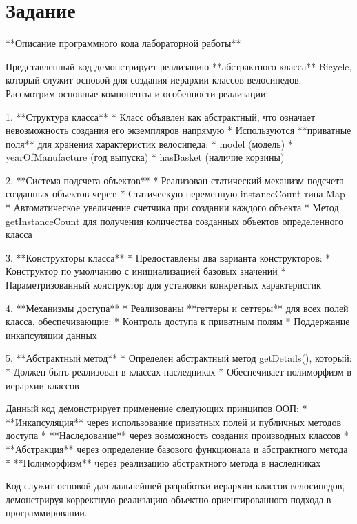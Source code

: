 \chapter{Задание}
\label{ch:Task1}

\begin{markdown}

**Описание программного кода лабораторной работы**

Представленный код демонстрирует реализацию **абстрактного класса** Bicycle, который служит основой для создания иерархии классов велосипедов. Рассмотрим основные компоненты и особенности реализации:

1. **Структура класса**
* Класс объявлен как абстрактный, что означает невозможность создания его экземпляров напрямую
* Используются **приватные поля** для хранения характеристик велосипеда:
  * model (модель)
  * yearOfManufacture (год выпуска)
  * hasBasket (наличие корзины)

2. **Система подсчета объектов**
* Реализован статический механизм подсчета созданных объектов через:
  * Статическую переменную instanceCount типа Map
  * Автоматическое увеличение счетчика при создании каждого объекта
  * Метод getInstanceCount для получения количества созданных объектов определенного класса

3. **Конструкторы класса**
* Предоставлены два варианта конструкторов:
  * Конструктор по умолчанию с инициализацией базовых значений
  * Параметризованный конструктор для установки конкретных характеристик

4. **Механизмы доступа**
* Реализованы **геттеры и сеттеры** для всех полей класса, обеспечивающие:
  * Контроль доступа к приватным полям
  * Поддержание инкапсуляции данных

5. **Абстрактный метод**
* Определен абстрактный метод getDetails(), который:
  * Должен быть реализован в классах-наследниках
  * Обеспечивает полиморфизм в иерархии классов

Данный код демонстрирует применение следующих принципов ООП:
* **Инкапсуляция** через использование приватных полей и публичных методов доступа
* **Наследование** через возможность создания производных классов
* **Абстракция** через определение базового функционала и абстрактного метода
* **Полиморфизм** через реализацию абстрактного метода в наследниках

Код служит основой для дальнейшей разработки иерархии классов велосипедов, демонстрируя корректную реализацию объектно-ориентированного подхода в программировании.

\end{markdown}

